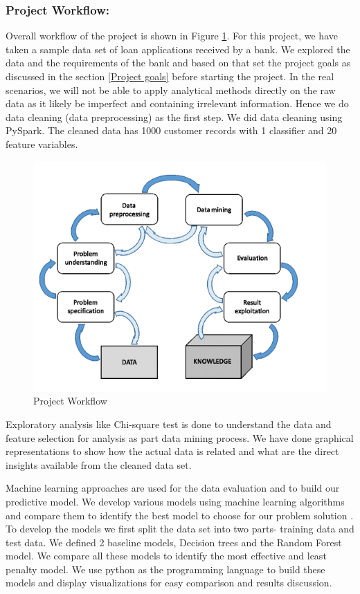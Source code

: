 \documentclass[sigconf]{acmart}
\begin{document}
\subsubsection{Project Workflow:}

Overall workflow of the project is shown in Figure \ref{fig:Figure1}. 
For this project, we have taken a sample data set of loan applications received by a bank. We explored the data and the requirements of the bank and based on that set the project goals as discussed in the section \ref{Project goals} before starting the project. In the real scenarios, we will not be able to apply analytical methods directly on the raw data as it likely be imperfect and containing irrelevant information. Hence we do data cleaning (data preprocessing) as the first step. We did data cleaning using PySpark. The cleaned data has 1000 customer records with 1 classifier and 20 feature variables.

\begin{figure}[htb]
  \centering
  \includegraphics[width=1.0\columnwidth]{project/images/Figure1.png}
  \caption{Project Workflow
  \cite{preprocessing}}
  \label{fig:Figure1} 
\end{figure}

Exploratory analysis like Chi-square test is done to understand the data and feature selection for analysis as part data mining process. We have done graphical representations to show how the actual data is related and what are the direct insights available from the cleaned data set.

Machine learning approaches are used for the data evaluation and to build our predictive model. We develop various models using machine learning algorithms and compare them to identify the best model to choose for our problem solution \cite{sas-machine-learning}. To develop the models we first split the data set into two parts- training data and test data. We defined 2 baseline models, Decision trees and the Random Forest model.  We compare all these models to identify the most effective and least penalty model. We use python as the programming language to build these models and display visualizations for easy comparison and results discussion.
\end{document}
